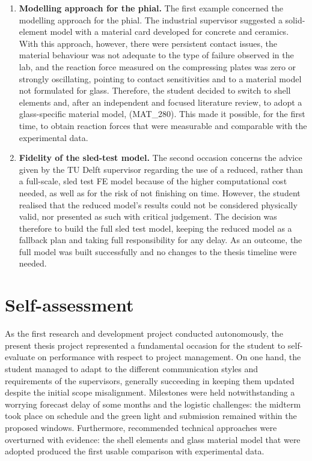 \begin{enumerate}
    \item \textbf{Modelling approach for the phial.} The first example concerned the modelling approach for the phial. The industrial supervisor suggested a solid-element model with a material card developed for concrete and ceramics. With this approach, however, there were persistent contact issues, the material behaviour was not adequate to the type of failure observed in the lab, and the reaction force measured on the compressing plates was zero or strongly oscillating, pointing to contact sensitivities and to a material model not formulated for glass. Therefore, the student decided to switch to shell elements and, after an independent and focused literature review, to adopt a glass-specific material model,  (MAT\_280). This made it possible, for the first time, to obtain reaction forces that were measurable and comparable with the experimental data.
    \item \textbf{Fidelity of the sled-test model.} The second occasion concerns the advice given by the TU Delft supervisor regarding the use of a reduced, rather than a full-scale, sled test FE model because of the higher computational cost needed, as well as for the risk of not finishing on time. However, the student realised that the reduced model's results could not be considered physically valid, nor presented as such with critical judgement. The decision was therefore to build the full sled test model, keeping the reduced model as a fallback plan and taking full responsibility for any delay. As an outcome, the full model was built successfully and no changes to the thesis timeline were needed.
\end{enumerate}


\section{Self-assessment}
\label{sec:pm-self}
As the first research and development project conducted autonomously, the present thesis project represented a fundamental occasion for the student to self-evaluate on performance with respect to project management. On one hand, the student managed to adapt to the different communication styles and requirements of the supervisors, generally succeeding in keeping them updated despite the initial scope misalignment. Milestones were held notwithstanding a worrying forecast delay of some months and the logistic challenges: the midterm took place on schedule and the green light and submission remained within the proposed windows. Furthermore, recommended technical approaches were overturned with evidence: the shell elements and glass material model that were adopted produced the first usable comparison with experimental data. 

